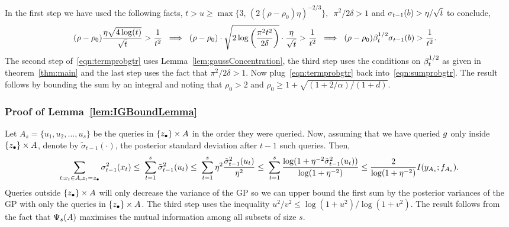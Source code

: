 In the first step we have used the following facts,
$t>u\geq\max\{3,\,(2(\rho-\rho_0)\eta)^{-2/3}\},\,$
$\pi^2/2\delta >1$ and
$\sigma_{t-1}(b) > \eta/\sqrt{t}$ to conclude,
\begin{align*}
(\rho-\rho_0)\frac{\eta\sqrt{4\log(t)}}{\sqrt{t}} > \frac{1}{t^2}
\;&\implies\;
(\rho-\rho_0)\cdot
\sqrt{2\log\left(\frac{\pi^2t^2}{2\delta}\right)}\cdot\frac{\eta}{\sqrt{t}} > 
            \frac{1}{t^2} 
\;\implies\;
(\rho-\rho_0) \beta^{1/2}_t\sigma_{t-1}(b) > \frac{1}{t^2}.
\end{align*}
The second step of~\eqref{eqn:termprobgtr} uses Lemma~\ref{lem:gaussConcentration},
the third step uses the conditions on $\beta^{1/2}_t$ as given in theorem~\ref{thm:main}
and the last step uses the fact that $\pi^2/2\delta > 1$.
Now plug~\eqref{eqn:termprobgtr} back into~\eqref{eqn:sumprobgtr}.
The result follows by bounding the sum by an integral and  noting that
$\rho_0>2$ and $\rho_0\geq 1+ \sqrt{(1+2/\alpha)/(1+d)}$.
\hfill\BlackBox


\subsubsection{Proof of Lemma~\ref{lem:IGBoundLemma}}

\newcommand{\xAss}[1]{u_{#1}}
\newcommand{\xAt}{\xAss{t}}
\newcommand{\sigmattmo}{\tilde{\sigma}_{t-1}}
\newcommand{\sigmattmosq}{\tilde{\sigma}^2_{t-1}}
Let $A_s = \{\xAss{1},\xAss{2},\dots,\xAss{s}\}$ be the queries in $\{z_{\bullet}\}\times A$
in the order they were queried.
Now, assuming that we have queried $g$ only inside $\{z_{\bullet}\}\times A$, denote by
$\sigmattmo(\cdot)$, the posterior standard deviation after $t-1$ such queries. Then,
\begin{align*}
\sum_{t:x_t\in A, \zt=\zhf} \sigmasqtmo(x_t) \leq\;
  \sum_{t=1}^s\sigmattmosq(\xAt) 
  \leq\; \sum_{t=1}^s \eta^2\frac{\sigmattmosq(\xAt)}{\eta^2}
  \leq\; \sum_{t=1}^s
    \frac{\log(1+\eta^{-2}\sigmattmosq(\xAt))}{\log(1+\eta^{-2})} 
  \leq \frac{2}{\log(1+\eta^{-2})} I(y_{A_s}; f_{A_s}).
\end{align*}
Queries outside $\{z_{\bullet}\}\times A$ will only decrease the variance of the GP so we can
upper bound
the first sum by the posterior variances of the GP with only the queries in
$\{z_{\bullet}\}\times A$.
The third step uses the inequality $u^2/v^2 \leq \log(1+u^2)/\log(1+v^2)$.
The result follows from the fact that $\Psi_{s}(A)$
maximises the mutual information among all subsets of size $s$.
\hfill\BlackBox


